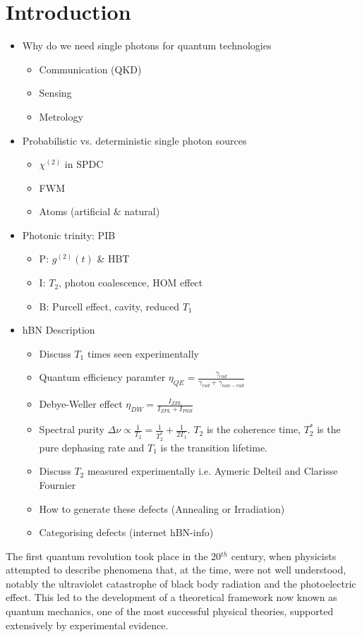 \section{Introduction}

\begin{itemize}
    \item Why do we need single photons for quantum technologies 
    \begin{itemize}
        \item Communication (QKD)
        \item Sensing
        \item Metrology
    \end{itemize}
    \item Probabilistic vs. deterministic single photon sources
    \begin{itemize}
        \item $\chi^{(2)}$ in SPDC
        \item FWM
        \item Atoms (artificial \& natural)
    \end{itemize}
    \item Photonic trinity: PIB
    \begin{itemize}
        \item P: $g^{(2)}(t)$ \& HBT
        \item I: $T_2$, photon coalescence, HOM effect
        \item B: Purcell effect, cavity, reduced $T_1$  
    \end{itemize}
    \item hBN Description
    \begin{itemize}
        \item Discuss $T_1$ times seen experimentally
        \item Quantum efficiency paramter $\eta_{QE}=\frac{\gamma_{rad}}{\gamma_{rad} + \gamma_{non-rad}}$
        \item Debye-Weller effect $\eta_{DW}=\frac{I_{ZPL}}{I_{ZPL}+I_{PSB}}$
        \item Spectral purity $\Delta \nu \propto \frac{1}{T_2}=\frac{1}{T_2^*}+\frac{1}{2T_1}$. $T_2$ is the coherence time, $T_2^*$ is the pure dephasing rate and $T_1$ is the transition lifetime.
        \item Discuss $T_2$ measured experimentally i.e. Aymeric Delteil and Clarisse Fournier
        \item How to generate these defects (Annealing or Irradiation)
        \item Categorising defects (internet hBN-info)
    \end{itemize}
\end{itemize}

The first quantum revolution took place in the 20$^{th}$ century, when physicists attempted to describe phenomena that, at the time, were not well understood, notably the ultraviolet catastrophe of black body radiation \cite{Einstein1905} and the photoelectric effect. This led to the development of a theoretical framework now known as quantum mechanics, one of the most successful physical theories, supported extensively by experimental evidence. 
